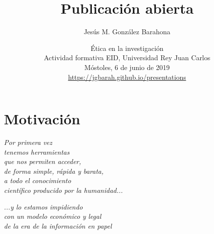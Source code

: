 \documentclass[17pt,aspectratio=169]{beamer}
\begin{document}
\title{Publicación abierta}
\author{Jesús M. González Barahona}

\date{Ética en la investigación \\
  Actividad formativa EID, Universidad Rey Juan Carlos \\
  Móstoles, 6 de junio de 2019\\
{\small \url{https://jgbarah.github.io/presentations}} \\}

\frame{
\maketitle
}




\section{Motivación}

\begin{frame}

  {\em \Large
    Por primera vez \\
    tenemos herramientas \\
    que nos permiten acceder, \\
    de forma simple, rápida y barata, \\
    a todo el conocimiento \\
    científico producido por la humanidad...\\
  }
  
\end{frame}

\begin{frame}

  {\em \Large
    ...y lo estamos impidiendo \\
    con un modelo económico y legal \\
    de la era de la información en papel \\
  }
  
\end{frame}
\end{document}
